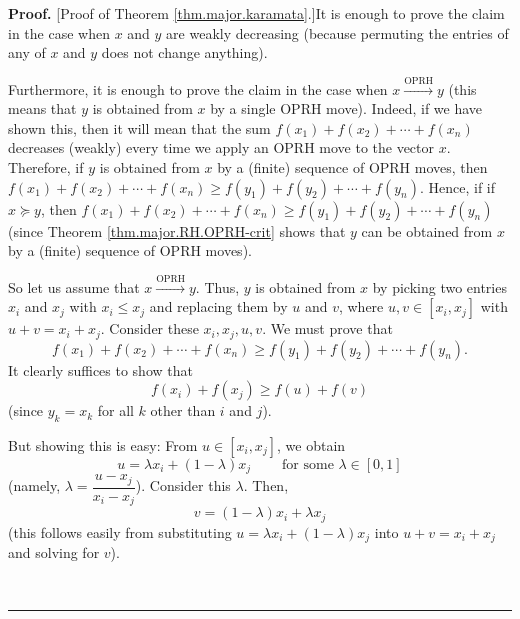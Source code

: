 \documentclass[numbers=enddot,12pt,final,onecolumn,notitlepage]{scrartcl}%
\numberwithin{exer}{subsection}
\theoremstyle{definition}
\newenvironment{proof}[1][Proof]{\noindent\textbf{#1.} }{\ \rule{0.5em}{0.5em}}
\begin{document}
\begin{proof}
[Proof of Theorem \ref{thm.major.karamata}.]It is enough to prove the claim in
the case when $x$ and $y$ are weakly decreasing (because permuting the entries
of any of $x$ and $y$ does not change anything).

Furthermore, it is enough to prove the claim in the case when
$x\overset{\text{OPRH}}{\longrightarrow}y$ (this means that $y$ is obtained
from $x$ by a single OPRH move). Indeed, if we have shown this, then it will
mean that the sum $f\left(  x_{1}\right)  +f\left(  x_{2}\right)
+\cdots+f\left(  x_{n}\right)  $ decreases (weakly) every time we apply an
OPRH move to the vector $x$. Therefore, if $y$ is obtained from $x$ by a
(finite) sequence of OPRH moves, then $f\left(  x_{1}\right)  +f\left(
x_{2}\right)  +\cdots+f\left(  x_{n}\right)  \geq f\left(  y_{1}\right)
+f\left(  y_{2}\right)  +\cdots+f\left(  y_{n}\right)  $. Hence, if if
$x\succcurlyeq y$, then $f\left(  x_{1}\right)  +f\left(  x_{2}\right)
+\cdots+f\left(  x_{n}\right)  \geq f\left(  y_{1}\right)  +f\left(
y_{2}\right)  +\cdots+f\left(  y_{n}\right)  $ (since Theorem
\ref{thm.major.RH.OPRH-crit} shows that $y$ can be obtained from $x$ by a
(finite) sequence of OPRH moves).

So let us assume that $x\overset{\text{OPRH}}{\longrightarrow}y$. Thus, $y$ is
obtained from $x$ by picking two entries $x_{i}$ and $x_{j}$ with $x_{i}\leq
x_{j}$ and replacing them by $u$ and $v$, where $u,v\in\left[  x_{i}%
,x_{j}\right]  $ with $u+v=x_{i}+x_{j}$. Consider these $x_{i},x_{j},u,v$. We
must prove that%
\[
f\left(  x_{1}\right)  +f\left(  x_{2}\right)  +\cdots+f\left(  x_{n}\right)
\geq f\left(  y_{1}\right)  +f\left(  y_{2}\right)  +\cdots+f\left(
y_{n}\right)  .
\]
It clearly suffices to show that%
\[
f\left(  x_{i}\right)  +f\left(  x_{j}\right)  \geq f\left(  u\right)
+f\left(  v\right)
\]
(since $y_{k}=x_{k}$ for all $k$ other than $i$ and $j$).

But showing this is easy: From $u\in\left[  x_{i},x_{j}\right]  $, we obtain
\[
u=\lambda x_{i}+\left(  1-\lambda\right)  x_{j}\ \ \ \ \ \ \ \ \ \ \text{for
some }\lambda\in\left[  0,1\right]
\]
(namely, $\lambda=\dfrac{u-x_{j}}{x_{i}-x_{j}}$). Consider this $\lambda$.
Then,%
\[
v=\left(  1-\lambda\right)  x_{i}+\lambda x_{j}%
\]
(this follows easily from substituting $u=\lambda x_{i}+\left(  1-\lambda
\right)  x_{j}$ into $u+v=x_{i}+x_{j}$ and solving for $v$).


\end{proof}
\end{document}
